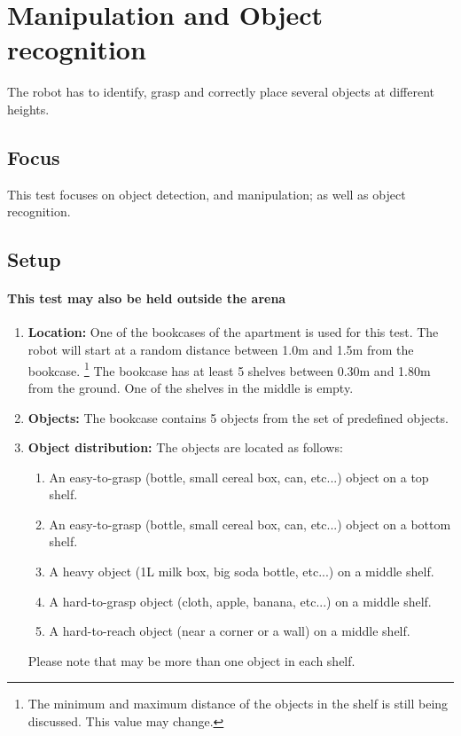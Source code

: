 \section{Manipulation and Object recognition}

The robot has to identify, grasp and correctly place several objects at different heights.

\subsection{Focus}

This test focuses on object detection, and manipulation; as well as object recognition.

\subsection{Setup}
\paragraph{This test may also be held outside the arena}

\begin{enumerate}
\item \textbf{Location:} One of the bookcases of the apartment is used for this test. The robot will start at a random distance between 1.0m and 1.5m from the bookcase.
\footnote{The minimum and maximum distance of the objects in the shelf is still being discussed. This value may change.}
The bookcase has at least 5 shelves between 0.30m and 1.80m from the ground. One of the shelves in the middle is empty.
\item \textbf{Objects:} The bookcase contains 5 objects from the set of predefined objects.
\item \textbf{Object distribution:} The objects are located as follows:
\begin{enumerate}
\item An easy-to-grasp (bottle, small cereal box, can, etc...) object on a top shelf.
\item An easy-to-grasp (bottle, small cereal box, can, etc...) object on a bottom shelf.
\item A heavy object (1L milk box, big soda bottle, etc...) on a middle shelf.
\item A hard-to-grasp object (cloth, apple, banana, etc...) on a middle shelf.
\item A hard-to-reach object (near a corner or a wall) on a middle shelf.
\end{enumerate}
Please note that may be more than one object in each shelf.
\end{enumerate}

